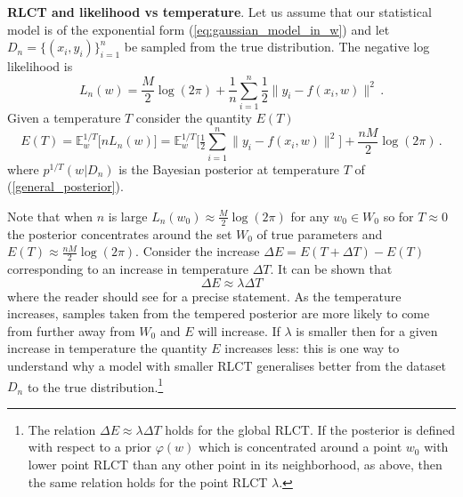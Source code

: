 \documentclass{article} %
\begin{document}

\textbf{RLCT and likelihood vs temperature}. Let us assume that our statistical model is of the exponential form  (\ref{eq:gaussian_model_in_w}) and let $D_n = \{ (x_i,y_i) \}_{i=1}^n$ be sampled from the true distribution. The negative log likelihood is
\begin{equation}
L_n(w) = \frac{M}{2} \log(2\pi) + \frac{1}{n} \sum_{i=1}^n \frac{1}{2} \| y_i - f(x_i,w) \|^2\,.
\end{equation}
Given a temperature $T$ consider the quantity $E(T)$ 
\[
E(T) = \mathbb{E}^{1/T}_w\big[nL_n(w) \big] = \mathbb{E}_w^{1/T}\Big[ \tfrac{1}{2} \sum_{i=1}^n \| y_i - f(x_i, w) \|^2 \Big] + \frac{nM}{2} \log(2\pi)\,.
\]
where $p^{1/T}(w|D_n)$ is the Bayesian posterior at temperature $T$ of (\ref{general_posterior}).

Note that when $n$ is large $L_n(w_0) \approx \frac{M}{2} \log(2\pi)$ for any $w_0 \in W_0$ so for $T \approx 0$ the posterior concentrates around the set $W_0$ of true parameters and $E(T) \approx \frac{nM}{2} \log(2\pi)$. Consider the increase $\Delta E = E(T + \Delta T) - E(T)$ corresponding to an increase in temperature $\Delta T$. It can be shown that 
\[
\Delta E \approx \lambda \Delta T
\]
where the reader should see \citep[Corollary 3]{watanabe_widely_2013} for a precise statement. As the temperature increases, samples taken from the tempered posterior are more likely to come from further away from $W_0$ and $E$ will increase. If $\lambda$ is smaller then for a given increase in temperature the quantity $E$ increases less: this is one way to understand why a model with smaller RLCT generalises better from the dataset $D_n$ to the true distribution.\footnote{The relation $\Delta E \approx \lambda \Delta T$ holds for the global RLCT. If the posterior is defined with respect to a prior $\varphi(w)$ which is concentrated around a point $w_0$ with lower point RLCT than any other point in its neighborhood, as above, then the same relation holds for the point RLCT $\lambda$.}


\end{document}
